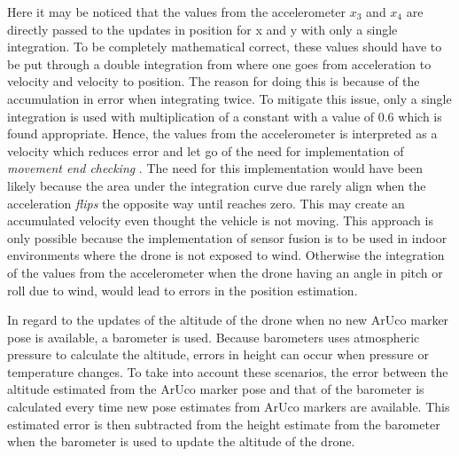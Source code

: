 \documentclass[../Head/report.tex]{subfiles}
\begin{document}
Here it may be noticed that the values from the accelerometer $x_3$ and $x_4$ are directly passed to the updates in position for x and y with only a single integration. To be completely mathematical correct, these values should have to be put through a double integration from where one goes from acceleration to velocity and velocity to position. The reason for doing this is because of the accumulation in error when integrating twice. To mitigate this issue, only a single integration is used with multiplication of a constant with a value of 0.6 which is found appropriate. Hence, the values from the accelerometer is interpreted as a velocity which reduces error and let go of the need for implementation of \textit{movement end checking} \cite[p.~6]{ImplementingPositioningAlgorithmsUsingAccelerometers}. The need for this implementation would have been likely because the area under the integration curve due rarely align when the acceleration \textit{flips} the opposite way until reaches zero. This may create an accumulated velocity even thought the vehicle is not moving. This approach is only possible because the implementation of sensor fusion is to be used in indoor environments where the drone is not exposed to wind. Otherwise the integration of the values from the accelerometer when the drone having an angle in pitch or roll due to wind, would lead to errors in the position estimation.

In regard to the updates of the altitude of the drone when no new ArUco marker pose is available, a barometer is used. Because barometers uses atmospheric pressure to calculate the altitude, errors in height can occur when pressure or temperature changes. To take into account these scenarios, the error between the altitude estimated from the ArUco marker pose and that of the barometer is calculated every time new pose estimates from ArUco markers are available. This estimated error is then subtracted from the height estimate from the barometer when the barometer is used to update the altitude of the drone. 
\end{document}
